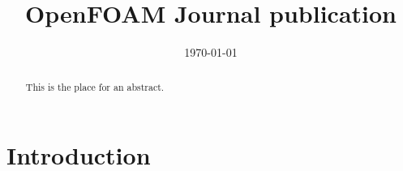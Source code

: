 \documentclass[e-only,10pt,reqno]{ofj}
\newcommand{\OF}[0]{OpenFOAM\textsuperscript{\textregistered} }
\begin{document}


\title[\OF Journal publication]{\OF Journal publication}









\begin{abstract}
This is the place for an abstract.
\end{abstract}


\date{\today}

\dedicatory{}


\maketitle

\linenumbers  


\section{Introduction}
\end{document}
